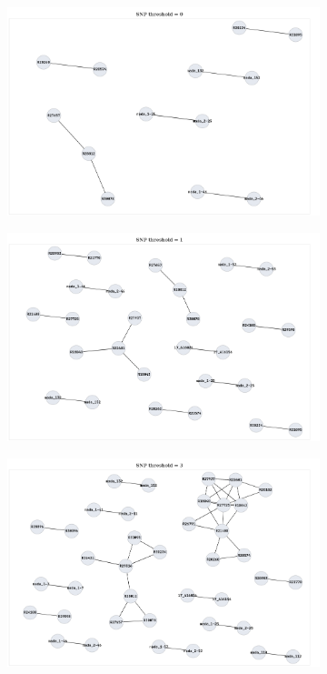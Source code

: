 \begin{figure}
     \centering
     \begin{subfigure}[b]{0.45\textwidth}
         \centering
         \includegraphics[width=\textwidth]{Appendix1/Figs/compare_clusters_t0.png}
         \caption{}
     \end{subfigure}
     \hfill
     \begin{subfigure}[b]{0.45\textwidth}
         \centering
         \includegraphics[width=\textwidth]{Appendix1/Figs/compare_clusters_t1.png}
         \caption{}
     \end{subfigure}
     \begin{subfigure}[b]{0.45\textwidth}
         \centering
         \includegraphics[width=\textwidth]{Appendix1/Figs/compare_clusters_t3.png}

\end{subfigure}
\end{figure}
